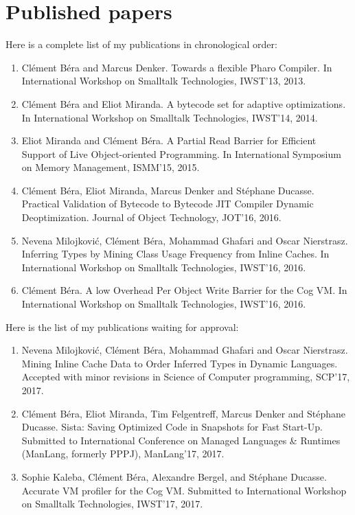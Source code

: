 \documentclass[a4paper,12pt,twoside]{../includes/ThesisStyle}
\begin{document}
\section{Published papers}

Here is a complete list of my publications in chronological order:

\begin{enumerate}
	\item Cl\'ement B\'era and Marcus Denker. Towards a flexible Pharo Compiler. In International Workshop on Smalltalk Technologies, IWST'13, 2013.
	\item Cl\'ement B\'era and Eliot Miranda. A bytecode set for adaptive optimizations. In International Workshop on Smalltalk Technologies, IWST'14, 2014.
	\item Eliot Miranda and Cl\'ement B\'era. A Partial Read Barrier for Efficient Support of Live Object-oriented Programming. In International Symposium on Memory Management, ISMM'15, 2015.
	\item Cl\'ement B\'era, Eliot Miranda, Marcus Denker and St\'ephane Ducasse. Practical Validation of Bytecode to Bytecode JIT Compiler Dynamic Deoptimization. Journal of Object Technology, JOT'16, 2016.
	\item Nevena Milojkovi\'c, Cl\'ement B\'era, Mohammad Ghafari and Oscar Nierstrasz. Inferring Types by Mining Class Usage Frequency from Inline Caches. In International Workshop on Smalltalk Technologies, IWST'16, 2016.
	\item Cl\'ement B\'era. A low Overhead Per Object Write Barrier for the Cog VM. In International Workshop on Smalltalk Technologies, IWST'16, 2016.
\end{enumerate}

Here is the list of my publications waiting for approval:

\begin{enumerate}
	\item Nevena Milojkovi\'c, Cl\'ement B\'era, Mohammad Ghafari and Oscar Nierstrasz. Mining Inline Cache Data to Order Inferred Types in Dynamic Languages. Accepted with minor revisions in Science of Computer programming, SCP'17, 2017.
	\item Cl\'ement B\'era, Eliot Miranda, Tim Felgentreff, Marcus Denker and St\'ephane Ducasse. Sista: Saving Optimized Code in Snapshots for Fast Start-Up. Submitted to International Conference on Managed Languages \& Runtimes (ManLang, formerly PPPJ), ManLang'17, 2017.
	\item Sophie Kaleba, Cl\'ement B\'era, Alexandre Bergel, and St\'ephane Ducasse. Accurate VM profiler for the Cog VM. Submitted to International Workshop on Smalltalk Technologies, IWST'17, 2017.
\end{enumerate}
\end{document}

